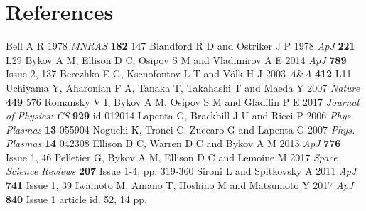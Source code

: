 \documentclass[a4paper]{jpconf}
\begin{document}
\section*{References}
\begin{thebibliography}{20}
	 Bell A R 1978 \textit{MNRAS} \textbf{182} 147
	 Blandford R D and Ostriker J P 1978 \textit{ApJ} \textbf{221} L29 
	 Bykov A M, Ellison D C, Osipov S M and Vladimirov A E 2014 \textit{ApJ} \textbf{789} Issue 2, 137
	 Berezhko E G, Ksenofontov L T and V{\"o}lk H J  2003 \textit{A}{\&}\textit{A} \textbf{412} L11
	 Uchiyama Y, Aharonian F A, Tanaka T, Takahashi T and Maeda Y 2007 \textit{Nature} \textbf{449} 576
	 Romansky V I, Bykov A M, Osipov S M and Gladilin P E 2017 \textit{Journal of Physics: CS} \textbf{929} id 012014 
	 Lapenta G, Brackbill J U and Ricci P 2006 \textit{Phys. Plasmas} \textbf{13} 055904
	 Noguchi K, Tronci C, Zuccaro G and Lapenta G 2007 \textit{Phys. Plasmas} \textbf{14} 042308
	 Ellison D C, Warren D C and Bykov A M 2013 \textit{ApJ} \textbf{776} Issue 1, 46
	 Pelletier G, Bykov A M, Ellison D C and Lemoine M 2017 \textit{Space Science Reviews} \textbf{207} Issue 1-4, pp. 319-360
	 Sironi L and Spitkovsky A 2011 \textit{ApJ} \textbf{741} Issue 1, 39
	 Iwamoto M, Amano T, Hoshino M and Matsumoto Y 2017 \textit{ApJ} \textbf{840} Issue 1 article id. 52, 14 pp.
\end{thebibliography}
\end{document}
